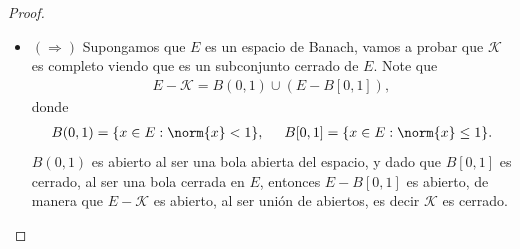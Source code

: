 \begin{proof}
    \begin{itemize}
        \item $(\Longrightarrow)$ Supongamos que $E$ es un espacio de Banach, vamos a probar que $\mathcal{K}$ es completo viendo que es un subconjunto cerrado de $E$. Note que 
        \begin{align*}
            E-\mathcal{K}=B(0,1)\cup (E-B[0,1]),
        \end{align*}
        donde 
        \begin{align*}
            B(0,1)=\{x \in E: \norm{x}<1\}, \hspace{5mm} B[0,1]=\{x \in E:\norm{x}\leq 1\}.
        \end{align*}
        $B(0,1)$ es abierto al ser una bola abierta del espacio, y dado que $B[0,1]$ es cerrado, al ser una bola cerrada en $E$, entonces $E-B[0,1]$ es abierto, de manera que $E-\mathcal{K}$ es abierto, al ser unión de abiertos, es decir $\mathcal{K}$ es cerrado.


\end{itemize}
\end{proof}
